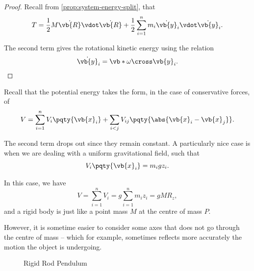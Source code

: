 \begin{proof}
    Recall from \autoref{prop:system-energy-split}, that
    \begin{equation}
        T = \frac{1}{2} M \dot{\vb{R}} \vdot \dot{\vb{R}} + \frac{1}{2} \sum_{i = 1}^{n} m_i \dot{\vb{y}}_i \vdot \dot{\vb{y}}_i.
    \end{equation}

    The second term gives the rotational kinetic energy using the relation
    \begin{equation}
        \dot{\vb{y}}_i = \vb*{\omega} \cross \vb{y}_i.
    \end{equation}
\end{proof}

Recall that the potential energy takes the form, in the case of conservative forces, of
\begin{equation}
    V = \sum_{i = 1}^{n} V_i \pqty{\vb{x}_i} + \sum_{i < j} V_{ij} \pqty{\abs{\vb{x}_i - \vb{x}_j}}.
\end{equation}

The second term drops out since they remain constant. A particularly nice case is when we are dealing with a uniform gravitational field, such that
\begin{equation}
    V_i \pqty{\vb{x}_i} = m_i g z_i.
\end{equation}

In this case, we have
\begin{equation}
    V = \sum_{i = 1}^{n} V_i = g \sum_{i = 1}^{n} m_i z_i = g M R_z,
\end{equation}
and a rigid body is just like a point mass \(M\) at the centre of mass \(P\).

However, it is sometime easier to consider some axes that does not go through the centre of mass -- which for example, sometimes reflects more accurately the motion the object is undergoing.

\begin{figure}[ht!]
    \centering

    \caption{Rigid Rod Pendulum}
    \label{fig:rigid-rod-pendulum}%
\end{figure}

